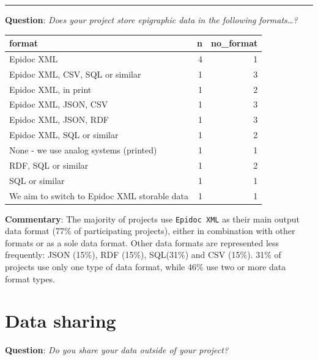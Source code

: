 \documentclass[
  12pt,
]{scrreprt}
\begin{document}
\begin{center}\rule{0.5\linewidth}{0.5pt}\end{center}

\textbf{Question}: \emph{Does your project store epigraphic data in the
following formats\ldots?}

\begin{longtable}[]{@{}lrr@{}}
\toprule
format & n & no\_format \\
\midrule
\endhead
Epidoc XML & 4 & 1 \\
Epidoc XML, CSV, SQL or similar & 1 & 3 \\
Epidoc XML, in print & 1 & 2 \\
Epidoc XML, JSON, CSV & 1 & 3 \\
Epidoc XML, JSON, RDF & 1 & 3 \\
Epidoc XML, SQL or similar & 1 & 2 \\
None - we use analog systems (printed) & 1 & 1 \\
RDF, SQL or similar & 1 & 2 \\
SQL or similar & 1 & 1 \\
We aim to switch to Epidoc XML storable data & 1 & 1 \\
\bottomrule
\end{longtable}

\textbf{Commentary}: The majority of projects use \texttt{Epidoc\ XML}
as their main output data format (77\% of participating projects),
either in combination with other formats or as a sole data format. Other
data formats are represented less frequently: JSON (15\%), RDF (15\%),
SQL(31\%) and CSV (15\%). 31\% of projects use only one type of data
format, while 46\% use two or more data format types.

\hypertarget{data-sharing}{%
\section{Data sharing}\label{data-sharing}}

\textbf{Question}: \emph{Do you share your data outside of your
project?}
\end{document}
